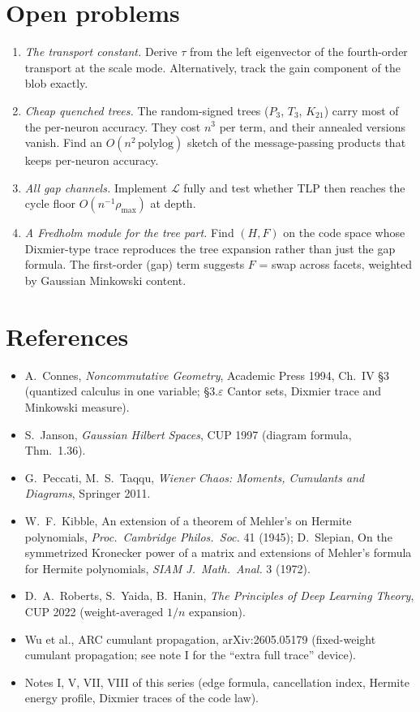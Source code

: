 \documentclass[11pt]{article}
\theoremstyle{definition}
\theoremstyle{remark}
\begin{document}
\section{Open problems}\label{sec:open}
\begin{enumerate}
\item \emph{The transport constant.} Derive $\tau$ from the left eigenvector of the fourth-order transport at the scale mode. Alternatively, track the gain component of the blob exactly.
\item \emph{Cheap quenched trees.} The random-signed trees ($P_3$, $T_3$, $K_{21}$) carry most of the per-neuron accuracy. They cost $n^3$ per term, and their annealed versions vanish. Find an $O(n^2\,\mathrm{polylog})$ sketch of the message-passing products that keeps per-neuron accuracy.
\item \emph{All gap channels.} Implement $\mathcal L$ fully and test whether TLP then reaches the cycle floor $O(n^{-1}\rho_{\max})$ at depth.
\item \emph{A Fredholm module for the tree part.} Find $(H,F)$ on the code space whose Dixmier-type trace reproduces the tree expansion rather than just the gap formula. The first-order (gap) term suggests $F$ = swap across facets, weighted by Gaussian Minkowski content.
\end{enumerate}

\section*{References}
\begin{itemize}\small
\item A.~Connes, \emph{Noncommutative Geometry}, Academic Press 1994, Ch.~IV \S3 (quantized calculus in one variable; \S3.$\varepsilon$ Cantor sets, Dixmier trace and Minkowski measure).
\item S.~Janson, \emph{Gaussian Hilbert Spaces}, CUP 1997 (diagram formula, Thm.~1.36).
\item G.~Peccati, M.~S.~Taqqu, \emph{Wiener Chaos: Moments, Cumulants and Diagrams}, Springer 2011.
\item W.~F.~Kibble, An extension of a theorem of Mehler's on Hermite polynomials, \emph{Proc.\ Cambridge Philos.\ Soc.} 41 (1945); D.~Slepian, On the symmetrized Kronecker power of a matrix and extensions of Mehler's formula for Hermite polynomials, \emph{SIAM J.\ Math.\ Anal.} 3 (1972).
\item D.~A.~Roberts, S.~Yaida, B.~Hanin, \emph{The Principles of Deep Learning Theory}, CUP 2022 (weight-averaged $1/n$ expansion).
\item Wu et al., ARC cumulant propagation, arXiv:2605.05179 (fixed-weight cumulant propagation; see note I for the ``extra full trace'' device).
\item Notes I, V, VII, VIII of this series (edge formula, cancellation index, Hermite energy profile, Dixmier traces of the code law).
\end{itemize}
\end{document}
